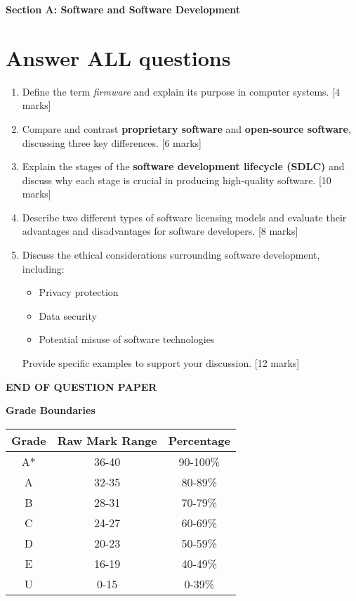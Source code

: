 \documentclass[12pt]{article}
\begin{document}
\newpage

\begin{center}
{\Large\textbf{Section A: Software and Software Development}}
\end{center}

\section*{Answer ALL questions}

\begin{enumerate}
\item Define the term \textit{firmware} and explain its purpose in computer systems. [4 marks]

\item Compare and contrast \textbf{proprietary software} and \textbf{open-source software}, discussing three key differences. [6 marks]

\item Explain the stages of the \textbf{software development lifecycle (SDLC)} and discuss why each stage is crucial in producing high-quality software. [10 marks]

\item Describe two different types of software licensing models and evaluate their advantages and disadvantages for software developers. [8 marks]

\item Discuss the ethical considerations surrounding software development, including:
\begin{itemize}
\item Privacy protection
\item Data security
\item Potential misuse of software technologies
\end{itemize}
Provide specific examples to support your discussion. [12 marks]
\end{enumerate}

\vspace{1cm}

\begin{center}
\textbf{END OF QUESTION PAPER}
\end{center}

\newpage

\begin{center}
{\Large\textbf{Grade Boundaries}}

\begin{tabular}{|c|c|c|}
\hline
Grade & Raw Mark Range & Percentage \\
\hline
A* & 36-40 & 90-100\% \\
A & 32-35 & 80-89\% \\
B & 28-31 & 70-79\% \\
C & 24-27 & 60-69\% \\
D & 20-23 & 50-59\% \\
E & 16-19 & 40-49\% \\
U & 0-15 & 0-39\% \\
\hline
\end{tabular}
\end{center}
\end{document}

